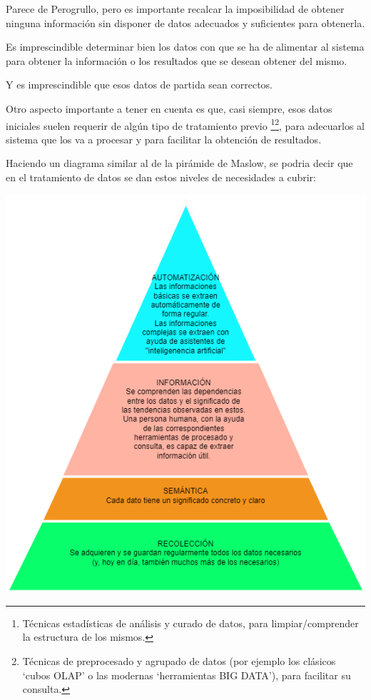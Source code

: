 \documentclass[spanish,12pt,a4paper,final,oneside]{book}
\begin{document}
Parece de Perogrullo, pero es importante recalcar la imposibilidad de obtener ninguna información sin disponer de datos adecuados y suficientes para obtenerla. 

Es imprescindible determinar bien los datos con que se ha de alimentar al sistema para obtener la información o los resultados que se desean obtener del mismo.

Y es imprescindible que esos datos de partida sean correctos.

\vspace{1cm}

Otro aspecto importante a tener en cuenta es que, casi siempre, esos datos iniciales suelen requerir de algún tipo de tratamiento previo \footnote{Técnicas estadísticas de análisis y curado de datos, para limpiar/comprender la estructura de los mismos.}\footnote{Técnicas de preprocesado y agrupado de datos (por ejemplo los clásicos `cubos OLAP' o las modernas `herramientas BIG DATA'), para facilitar su consulta.}, para adecuarlos al sistema que los va a procesar y para facilitar la obtención de resultados.

\vspace{1cm}

Haciendo un diagrama similar al de la pirámide de Maslow, se podria decir que en el tratamiento de datos se dan estos niveles de necesidades a cubrir:

\includegraphics[width=\textwidth]{PiramideDeTratamientoDeDatos}
\end{document}
